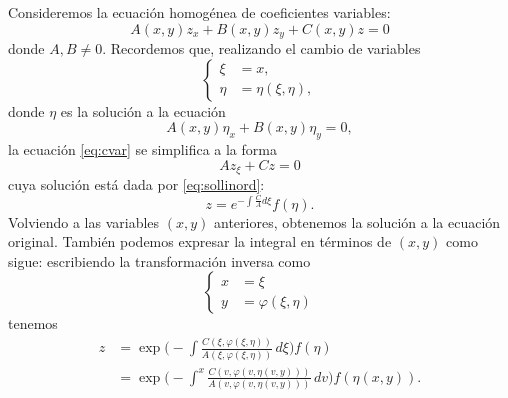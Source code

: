 \documentclass[11pt,letterpaper,draft]{report}
\theoremstyle{plain}
\theoremstyle{definition}
\theoremstyle{remark}
\newcommand\<{\langle}
\renewcommand\>{\rangle}
\renewcommand\phi\varphi
\begin{document}
Consideremos la ecuación homogénea de coeficientes variables:
\begin{equation}
  \label{eq:cvar}
  A(x,y)z_x + B(x,y)z_y + C(x,y)z = 0
\end{equation}
donde \(A,B\neq 0\).
Recordemos que, realizando el cambio de variables
\begin{equation}
  \label{eq:trans-inversa}
  \left\{
    \begin{aligned}
      \xi &= x,
      \\
      \eta &= \eta(\xi,\eta),
    \end{aligned}
  \right.
\end{equation}
donde \(\eta\) es la solución a la ecuación
\begin{equation}
  A(x,y)\eta_x + B(x,y)\eta_y = 0
,\end{equation}
la ecuación \eqref{eq:cvar} se simplifica a la forma
\begin{equation}
  \label{eq:cvar-simple}
  Az_\xi + Cz = 0
\end{equation}
cuya solución está dada por \eqref{eq:sollinord}:
\begin{equation}
  \label{eq:cvar-homo-sol-trans} 
  z = e^{-\int \frac{C}{A}d\xi} f(\eta)
.\end{equation}
Volviendo a las variables \((x,y)\) anteriores, obtenemos la solución
a la ecuación original.
También podemos expresar la integral en términos de \((x,y)\) como
sigue: escribiendo la transformación inversa como
\begin{equation}
  \left\{
    \begin{aligned}
      x &= \xi
      \\
      y &= \phi(\xi,\eta)
    \end{aligned}
  \right.
\end{equation}
tenemos
\begin{align}
  z
  &=
  \exp
  \Big(
    \!-\!\!
    \int \frac{C(\xi,\phi(\xi,\eta))}{A(\xi,\phi(\xi,\eta))} \, d\xi
  \Big)
  f(\eta)
  \\
  &= \exp
  \Big(
    \!-\!\!
    \int^x \frac{C(v,\phi(v,\eta(v,y)))}{A(v,\phi(v,\eta(v,y)))} \, dv
  \Big)
  f(\eta(x,y)).
  \label{eq:cvar-homo-sol}
\end{align}
\end{document}
